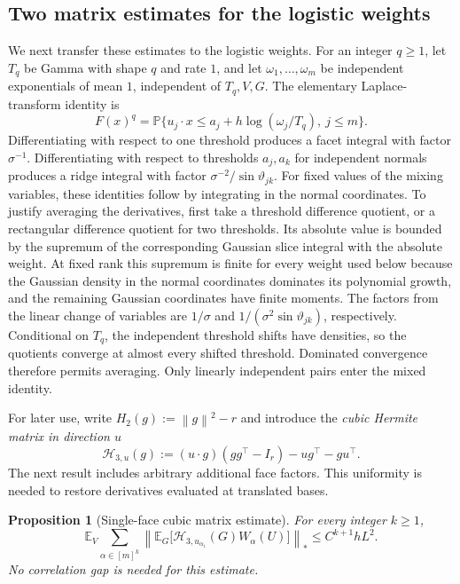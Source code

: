 \documentclass[11pt,letterpaper]{article}
\newtheorem{proposition}{Proposition}
\theoremstyle{remark}
\newcommand{\E}{\mathbb E}
\newcommand{\Pp}{\mathbb P}
\newcommand{\norm}[1]{\left\lVert#1\right\rVert}
\begin{document}
\subsection{Two matrix estimates for the logistic weights}
We next transfer these estimates to the logistic weights. For an integer
$q\ge1$, let $T_q$ be Gamma with shape $q$ and rate $1$, and let
$\omega_1,\ldots,\omega_m$ be independent exponentials of mean $1$,
independent of $T_q,V,G$. The elementary Laplace-transform identity is
\begin{equation}
 F(x)^q=\Pp\{u_j\cdot x\le a_j+h\log(\omega_j/T_q),\ j\le m\}.
 \label{h3:eq:mixture}
\end{equation}
Differentiating with respect to one threshold produces a facet integral
with factor $\sigma^{-1}$. Differentiating with respect to thresholds
$a_j,a_k$ for independent normals produces a ridge integral with factor
$\sigma^{-2}/\sin\vartheta_{jk}$. For fixed values of the mixing variables, these identities follow
by integrating in the normal coordinates. To justify averaging the
derivatives, first take a threshold difference quotient, or a rectangular
difference quotient for two thresholds. Its absolute value is bounded
by the supremum of the corresponding Gaussian slice integral with the
absolute weight. At fixed rank this supremum is finite for every weight
used below because the Gaussian density in the normal coordinates dominates
its polynomial growth, and the remaining Gaussian coordinates have
finite moments. The factors from the linear change of variables are
$1/\sigma$ and $1/(\sigma^2\sin\vartheta_{jk})$, respectively.
Conditional on $T_q$, the independent threshold shifts have densities,
so the quotients converge at almost every shifted threshold. Dominated
convergence therefore permits averaging. Only linearly independent
pairs enter the mixed identity.

For later use, write $H_2(g):=\norm g^2-r$ and introduce the
\emph{cubic Hermite matrix in direction $u$}
\begin{equation}
 \mathcal H_{3,u}(g):=(u\cdot g)(gg^\top-I_r)-ug^\top-gu^\top.
 \label{h3:eq:H3}
\end{equation}
The next result includes arbitrary additional face factors. This
uniformity is needed to restore derivatives evaluated at translated bases.

\begin{proposition}[Single-face cubic matrix estimate]\label{h3:prop:cubic}
For every integer $k\ge1$,
\begin{equation}
 \E_V\sum_{\alpha\in[m]^k}
 \left\|\E_G\bigl[\mathcal H_{3,u_{\alpha_1}}(G)
                    W_\alpha(U)\bigr]\right\|_*
 \le C^{k+1}hL^2.
 \label{h3:eq:cubic-matrix}
\end{equation}
No correlation gap is needed for this estimate.
\end{proposition}
\end{document}
